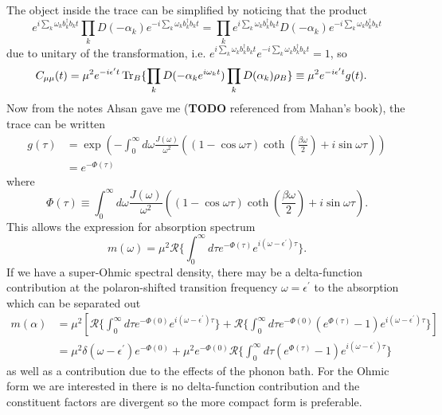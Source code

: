 \documentclass[]{article}
\begin{document}
The object inside the trace can be simplified by noticing that the product
\begin{equation}
e^{ i\sum_k \omega_k b_k^{\dagger}b_k t} \prod_k D(- \alpha_k) e^{- i\sum_k \omega_k b_k^{\dagger}b_k t} = \prod_k e^{ i\sum_k \omega_k b_k^{\dagger}b_k t} D(- \alpha_k) e^{- i\sum_k \omega_k b_k^{\dagger}b_k t}
\end{equation}
due to unitary of the transformation, i.e. $  e^{i\sum_k \omega_k b_k^{\dagger}b_k t} e^{- i\sum_k \omega_k b_k^{\dagger}b_k t}=1$, so
\begin{equation}
\begin{split}
C_{\mu \mu}(t) &=  \mu^2 e^{- i \epsilon^{\prime}t}\Tr_{B}\{\prod_k D(- \alpha_k e^{i\omega_k t})  \prod_k D(\alpha_k)\rho_{B} \} \equiv \mu^2 e^{- i \epsilon^{\prime}t}g(t).
\end{split}
\end{equation}
Now from the notes Ahsan gave me (\textbf{TODO} referenced from Mahan's book), the trace can be written
\begin{equation}
\begin{split}
g(\tau) &= \exp(-\int_{0}^{\infty}d\omega \frac{J(\omega)}{\omega^2}((1-\cos\omega\tau)\coth(\frac{\beta\omega}{2})+i\sin\omega\tau)) \\
&=  e^{-\Phi(\tau)}
\end{split}
\end{equation}
where 
\begin{equation}
\Phi(\tau) \equiv \int_{0}^{\infty}d\omega\frac{J(\omega)}{\omega^2}((1-\cos\omega\tau)\coth(\frac{\beta\omega}{2})+i\sin\omega\tau).
\end{equation}
This allows the expression for absorption spectrum
\begin{equation}
m(\omega) = \mu^2\mathcal{R}\{\int_{0}^{\infty}d\tau e^{-\Phi(\tau)} e^{i(\omega-\epsilon^{\prime})\tau}\}.
\end{equation}
If we have a super-Ohmic spectral density, there may be a delta-function contribution at the polaron-shifted transition frequency $\omega=\epsilon^{\prime}$ to the absorption which can be separated out
\begin{equation}
\begin{split}
m(\alpha) &= \mu^2\left[\mathcal{R}\{\int_{0}^{\infty}d\tau e^{-\Phi(0)} e^{i(\omega-\epsilon^{\prime})\tau}\} + \mathcal{R}\{\int_{0}^{\infty}d\tau e^{-\Phi(0)}(e^{\Phi(\tau)}-1) e^{i(\omega-\epsilon^{\prime})\tau}\} \right] \\
&= \mu^2\delta(\omega-\epsilon^{\prime}) e^{-\Phi(0)}  + \mu^2 e^{-\Phi(0)}\mathcal{R}\{\int_{0}^{\infty}d\tau  (e^{\Phi(\tau)}-1)e^{i(\omega-\epsilon^{\prime})\tau}\}
\end{split}
\end{equation}
as well as a contribution due to the effects of the phonon bath. For the Ohmic form we are interested in there is no delta-function contribution and the constituent factors are divergent so the more compact form is preferable.
\end{document}
